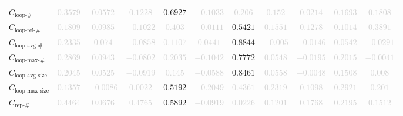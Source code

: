 \documentclass{standalone}
\newcommand{\loopnumname}{\text{loop-\#}}
\newcommand{\loopnum}{C_{\loopnumname}}
\newcommand{\looprelnumname}{\text{loop-rel-\#}}
\newcommand{\looprelnum}{C_{\looprelnumname}}
\newcommand{\loopavgname}{\text{loop-avg-\#}}
\newcommand{\loopavg}{C_{\loopavgname}}
\newcommand{\loopmaxname}{\text{loop-max-\#}}
\newcommand{\loopmax}{C_{\loopmaxname}}
\newcommand{\loopavgsizename}{\text{loop-avg-size}}
\newcommand{\loopavgsize}{C_{\loopavgsizename}}
\newcommand{\loopmaxsizename}{\text{loop-max-size}}
\newcommand{\loopmaxsize}{C_{\loopmaxsizename}}
\newcommand{\repnumname}{\text{rep-\#}}
\newcommand{\repnum}{C_{\repnumname}}
\begin{document}
\begin{tabular}{lcccccccccc}
$\loopnum$ & \textcolor{lightgray}{$0.3579$} & \textcolor{lightgray}{$0.0572$} & \textcolor{lightgray}{$0.1228$} & $0.6927$ & \textcolor{lightgray}{$-0.1033$} & \textcolor{lightgray}{$0.206$} & \textcolor{lightgray}{$0.152$} & \textcolor{lightgray}{$0.0214$} & \textcolor{lightgray}{$0.1693$} & \textcolor{lightgray}{$0.1808$} \\ 
$\looprelnum$ & \textcolor{lightgray}{$0.1809$} & \textcolor{lightgray}{$0.0985$} & \textcolor{lightgray}{$-0.1022$} & \textcolor{lightgray}{$0.403$} & \textcolor{lightgray}{$-0.0111$} & $0.5421$ & \textcolor{lightgray}{$0.1551$} & \textcolor{lightgray}{$0.1278$} & \textcolor{lightgray}{$0.1014$} & \textcolor{lightgray}{$0.3891$} \\ 
$\loopavg$ & \textcolor{lightgray}{$0.2335$} & \textcolor{lightgray}{$0.074$} & \textcolor{lightgray}{$-0.0858$} & \textcolor{lightgray}{$0.1107$} & \textcolor{lightgray}{$0.0441$} & $0.8844$ & \textcolor{lightgray}{$-0.005$} & \textcolor{lightgray}{$-0.0146$} & \textcolor{lightgray}{$0.0542$} & \textcolor{lightgray}{$-0.0291$} \\ 
$\loopmax$ & \textcolor{lightgray}{$0.2869$} & \textcolor{lightgray}{$0.0943$} & \textcolor{lightgray}{$-0.0802$} & \textcolor{lightgray}{$0.2035$} & \textcolor{lightgray}{$-0.1042$} & $0.7772$ & \textcolor{lightgray}{$0.0548$} & \textcolor{lightgray}{$-0.0195$} & \textcolor{lightgray}{$0.2015$} & \textcolor{lightgray}{$-0.0041$} \\ 
$\loopavgsize$ & \textcolor{lightgray}{$0.2045$} & \textcolor{lightgray}{$0.0525$} & \textcolor{lightgray}{$-0.0919$} & \textcolor{lightgray}{$0.145$} & \textcolor{lightgray}{$-0.0588$} & $0.8461$ & \textcolor{lightgray}{$0.0558$} & \textcolor{lightgray}{$-0.0048$} & \textcolor{lightgray}{$0.1508$} & \textcolor{lightgray}{$0.008$} \\ 
$\loopmaxsize$ & \textcolor{lightgray}{$0.1357$} & \textcolor{lightgray}{$-0.0086$} & \textcolor{lightgray}{$0.0022$} & $0.5192$ & \textcolor{lightgray}{$-0.2049$} & \textcolor{lightgray}{$0.4361$} & \textcolor{lightgray}{$0.2319$} & \textcolor{lightgray}{$0.1098$} & \textcolor{lightgray}{$0.2921$} & \textcolor{lightgray}{$0.201$} \\ 
$\repnum$ & \textcolor{lightgray}{$0.4464$} & \textcolor{lightgray}{$0.0676$} & \textcolor{lightgray}{$0.4765$} & $0.5892$ & \textcolor{lightgray}{$-0.0919$} & \textcolor{lightgray}{$0.0226$} & \textcolor{lightgray}{$0.1201$} & \textcolor{lightgray}{$0.1768$} & \textcolor{lightgray}{$0.2195$} & \textcolor{lightgray}{$0.1512$} \\ 

\end{tabular}
\end{document}
